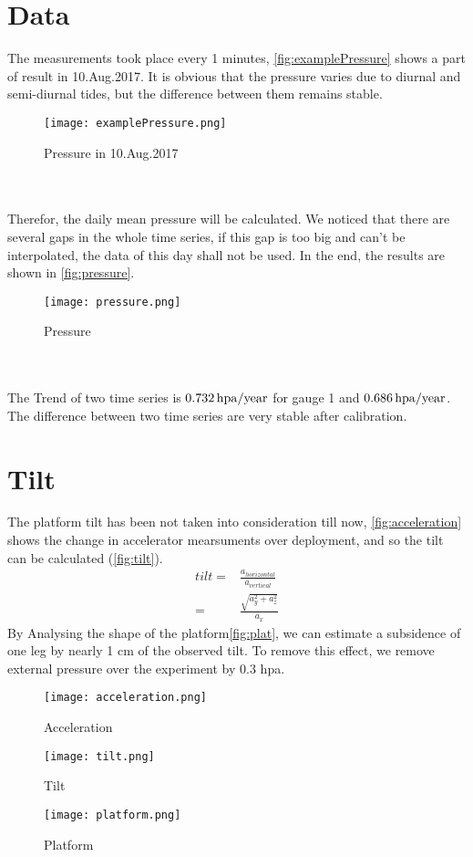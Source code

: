 \section{Data}
The measurements took place every 1 minutes, \autoref{fig:examplePressure} shows a part of result in 10.Aug.2017. It is obvious that the pressure varies due to diurnal and semi-diurnal tides, but the difference between them remains stable.
\begin{figure}[htpb]\centering
	\texttt{[image: examplePressure.png]}
	\caption{Pressure in 10.Aug.2017}
	\label{fig:examplePressure}
\end{figure}\\\\
Therefor, the daily mean pressure will be calculated. We noticed that there are several gaps in the whole time series, if this gap is too big and can't be interpolated, the data of this day shall not be used. In the end, the results are shown in \autoref{fig:pressure}. 
\begin{figure}[htpb]\centering
	\texttt{[image: pressure.png]}
	\caption{Pressure}
	\label{fig:pressure}
\end{figure}\\\\
The Trend of two time series is $0.732 \,\mathrm{hpa/year}$ for gauge 1 and $0.686 \,\mathrm{hpa/year}$. The difference between two time series are very stable after calibration. 



\section{Tilt}
The platform tilt has been not taken into consideration till now, \autoref{fig:acceleration} shows the change in accelerator mearsuments over deployment, and so the tilt can be calculated (\autoref{fig:tilt}).
\begin{align}
	tilt = & \frac{a_{horizontal}}{a_{vertical}} \\
	     = & \frac{\sqrt{a_y^2 + a_z^2}}{a_x}
\end{align}
By Analysing the shape of the platform\autoref{fig:plat}, we can estimate a subsidence of one leg by nearly 1 cm of the observed tilt. To remove this effect, we remove external pressure over the experiment by 0.3 hpa.
\begin{figure}[htpb]\centering
	\texttt{[image: acceleration.png]}
	\caption{Acceleration}
	\label{fig:acceleration}
\end{figure}
\begin{figure}[htpb]\centering
	\texttt{[image: tilt.png]}
	\caption{Tilt}
	\label{fig:tilt}
\end{figure}
\begin{figure}[htpb]\centering
	\texttt{[image: platform.png]}
	\caption{Platform}
	\label{fig:plat}
\end{figure}



